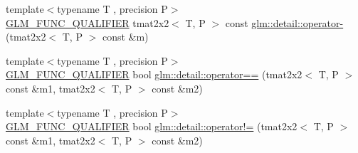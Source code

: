 \begin{DoxyCompactItemize}
\item 
{\footnotesize template$<$typename T , precision P$>$ }\\\hyperlink{setup_8hpp_a33fdea6f91c5f834105f7415e2a64407}{G\+L\+M\+\_\+\+F\+U\+N\+C\+\_\+\+Q\+U\+A\+L\+I\+F\+I\+ER} tmat2x2$<$ T, P $>$ const \hyperlink{namespaceglm_1_1detail_ad19b065281cf10cf3d910b38cdb487f9}{glm\+::detail\+::operator-\/} (tmat2x2$<$ T, P $>$ const \&m)
\item 
{\footnotesize template$<$typename T , precision P$>$ }\\\hyperlink{setup_8hpp_a33fdea6f91c5f834105f7415e2a64407}{G\+L\+M\+\_\+\+F\+U\+N\+C\+\_\+\+Q\+U\+A\+L\+I\+F\+I\+ER} bool \hyperlink{namespaceglm_1_1detail_aecfbeee46b45bc547f68b258c2fc7f5b}{glm\+::detail\+::operator==} (tmat2x2$<$ T, P $>$ const \&m1, tmat2x2$<$ T, P $>$ const \&m2)
\item 
{\footnotesize template$<$typename T , precision P$>$ }\\\hyperlink{setup_8hpp_a33fdea6f91c5f834105f7415e2a64407}{G\+L\+M\+\_\+\+F\+U\+N\+C\+\_\+\+Q\+U\+A\+L\+I\+F\+I\+ER} bool \hyperlink{namespaceglm_1_1detail_ad8e3bc0bf1a5648753bd57447b078921}{glm\+::detail\+::operator!=} (tmat2x2$<$ T, P $>$ const \&m1, tmat2x2$<$ T, P $>$ const \&m2)
\end{DoxyCompactItemize}
